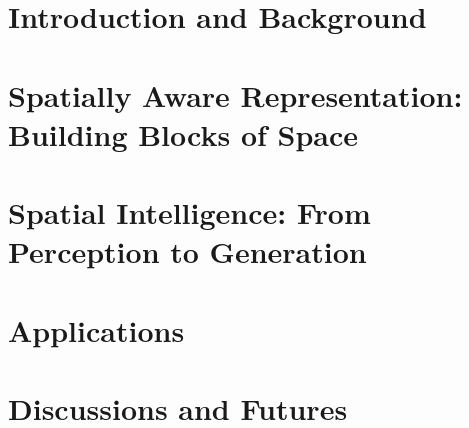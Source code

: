 




\part{Introduction and Background}

\part{Spatially Aware Representation: Building Blocks of Space}

\part{Spatial Intelligence: From Perception to Generation}
\label{part:3}

\part{Applications}
\label{part:applications}

\part{Discussions and Futures}




